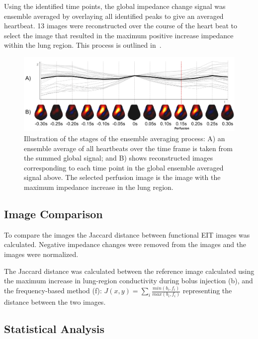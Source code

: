 Using the identified time points, the global impedance change signal 
was ensemble averaged by overlaying all identified peaks 
to give an averaged heartbeat. 13 images were reconstructed over the 
course of the heart beat to select the image that resulted in the maximum 
positive increase impedance within the lung region. This process is outlined 
in~.

\begin{figure}
\centering
\includegraphics[width=\textwidth]{chapter3-perfusion_analysis/imgs/fig-methodsTime.pdf}
\caption[Ensemble averaging analysis]{\label{fig:timeAnalysis}%
Illustration of the stages of the ensemble averaging process:
A) an ensemble average of all heartbeats over the time frame is taken from the 
summed global signal; and 
B) shows reconstructed images corresponding to each time point 
in the global ensemble averaged signal above.
The selected perfusion image is the image with the maximum impedance increase in the 
lung region.
}

\end{figure}

\subsection{Image Comparison}

To compare the images the Jaccard 
distance between functional EIT images was calculated. 
Negative impedance changes were removed from the images
and the images were normalized.

The Jaccard distance was calculated between the reference image 
calculated using the maximum increase in lung-region conductivity during 
bolus injection (b), and the frequency-based method (f):
$J(x,y) = \sum_{i}\frac{min(b_i,f_i)}{max(b_i,f_i)}$
representing the distance between the two images.

\subsection{Statistical Analysis}

